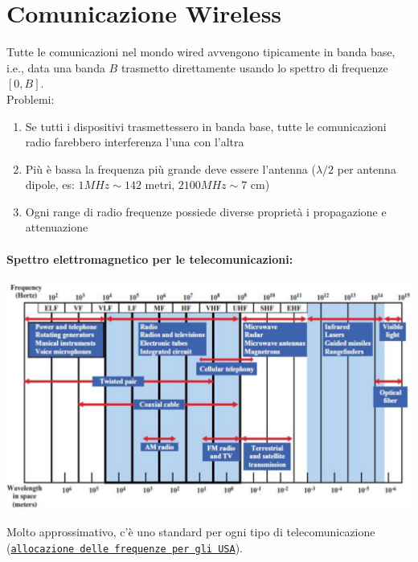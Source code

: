 \section{Comunicazione Wireless}
Tutte le comunicazioni nel mondo wired avvengono tipicamente in banda base, i.e., data una banda $B$ trasmetto direttamente usando lo spettro di frequenze $[0,B]$.\\ 

Problemi:
\begin{enumerate}
	\item Se tutti i dispositivi trasmettessero in banda base, tutte le comunicazioni radio farebbero interferenza l'una con l'altra
	\item Più è bassa la frequenza più grande deve essere l'antenna ($\lambda/2$ per antenna dipole, es: $1MHz \sim 142$ metri, $2100MHz \sim 7$ cm)
	\item Ogni range di radio frequenze possiede diverse proprietà i propagazione e attenuazione
\end{enumerate}

\paragraph{Spettro elettromagnetico per le telecomunicazioni:}
\begin{center}
	\includegraphics[width=0.98\linewidth]{img/wireless/emspectrum1}
\end{center}
Molto approssimativo, c'è uno standard per ogni tipo di telecomunicazione (\href{https://upload.wikimedia.org/wikipedia/commons/thumb/c/c7/United_States_Frequency_Allocations_Chart_2016_-_The_Radio_Spectrum.pdf/page1-1200px-United_States_Frequency_Allocations_Chart_2016_-_The_Radio_Spectrum.pdf.jpg}{\texttt{allocazione delle frequenze per gli USA}}).\\

